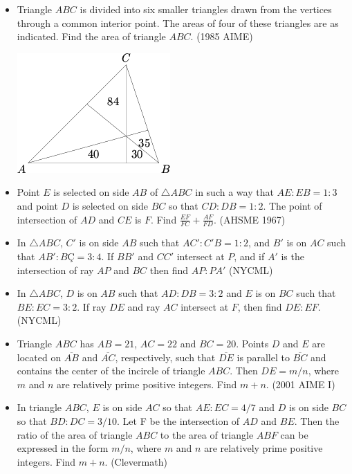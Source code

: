 \documentclass{article}
\begin{document}
\begin{itemize}
\item Triangle $ABC$ is divided into six smaller triangles drawn from the vertices through a common interior point. The areas of four of these triangles are as indicated. Find the area of triangle $ABC$. (1985 AIME)

\centerline{\includegraphics[scale=0.75]{1985AIME.png}}

\item Point $E$ is selected on side $AB$ of $\triangle ABC$ in such a way that $AE:EB=1:3$ and point $D$ is selected on side $BC$ so that $CD:DB=1:2$. The point of intersection of $AD$ and $CE$ is $F$. Find $\frac{EF}{FC}+\frac{AF}{FD}$. (AHSME 1967)

\item In $\triangle ABC$, $C'$ is on side $AB$ such that $AC':C'B=1:2$, and $B'$ is on $AC$ such that $AB':BÇ=3:4$. If $BB'$ and $CC'$ intersect at $P$, and if $A'$ is the intersection of ray $AP$ and $BC$ then find $AP:PA'$ (NYCML)

\item In $\triangle ABC$, $D$ is on $AB$ such that $AD:DB=3:2$ and $E$ is on $BC$ such that $BE:EC=3:2$. If ray $DE$ and ray $AC$ intersect at $F$, then find $DE:EF$. (NYCML)

\item Triangle $ABC$ has $AB=21$, $AC=22$ and $BC=20$. Points $D$ and $E$ are located on $\overline{AB}$ and $\overline{AC}$, respectively, such that $\overline{DE}$ is parallel to $\overline{BC}$ and contains the center of the incircle of triangle $ABC$. Then $DE=m/n$, where $m$ and $n$ are relatively prime positive integers. Find $m+n$. (2001 AIME I)


\item In triangle $ABC$, $E$ is on side $AC$ so that $AE:EC=4/7$ and $D$ is on side $BC$ so that $BD:DC=3/10$. Let F be the intersection of $AD$ and $BE$. Then the ratio of the area of triangle $ABC$ to the area of triangle $ABF$ can be expressed in the form $m/n$, where $m$ and $n$ are relatively prime positive integers. Find $m+n$. (Clevermath)


\end{itemize}
\end{document}
